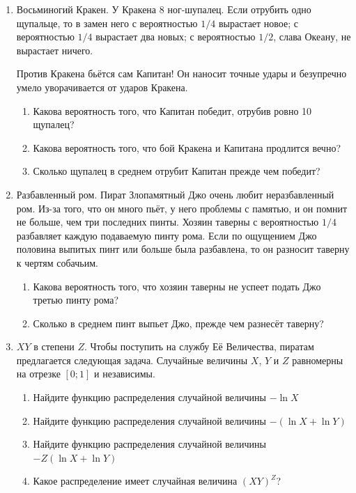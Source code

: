 \begin{enumerate}
\item Восьминогий Кракен. У Кракена 8 ног-шупалец. Если отрубить одно щупальце,
то в замен него с вероятностью $1/4$ вырастает новое; с вероятностью $1/4$ вырастает
два новых; с вероятностью $1/2$, слава Океану, не вырастает ничего.

Против Кракена бьётся сам Капитан! Он наносит точные удары и безупречно умело
уворачивается от ударов Кракена.
\begin{enumerate}
\item Какова вероятность того, что Капитан победит, отрубив ровно 10 щупалец?
\item Какова вероятность того, что бой Кракена и Капитана продлится вечно?
\item Сколько щупалец в среднем отрубит Капитан прежде чем победит?
\end{enumerate}

\item Разбавленный ром. Пират Злопамятный Джо очень любит неразбавленный ром. Из-за
того, что он много пьёт, у него проблемы с памятью, и он помнит не
больше, чем три последних пинты. Хозяин таверны с вероятностью $1/4$ разбавляет
каждую подаваемую пинту рома. Если по ощущением Джо половина выпитых
пинт или больше была разбавлена, то он разносит таверну к чертям собачьим.
\begin{enumerate}
\item Какова вероятность того, что хозяин таверны не успеет подать Джо третью пинту рома?
\item Сколько в среднем пинт выпьет Джо, прежде чем разнесёт таверну?
\end{enumerate}

\item $XY$ в степени $Z$. Чтобы поступить на службу Её Величества, пиратам предлагается
следующая задача. Случайные величины $X$, $Y$ и $Z$ равномерны на отрезке $[0;1]$
и независимы.
\begin{enumerate}
\item Найдите функцию распределения случайной величины $-\ln X$
\item Найдите функцию распределения случайной величины $-(\ln X + \ln Y)$
\item Найдите функцию распределения случайной величины $-Z(\ln X + \ln Y)$
\item Какое распределение имеет случайная величина $(XY)^Z$?
\end{enumerate}


\end{enumerate}
